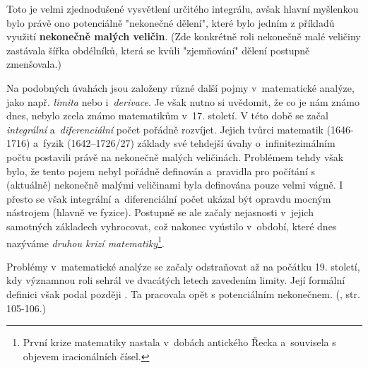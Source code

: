 Toto je velmi zjednodušené vysvětlení určitého integrálu, avšak hlavní myšlenkou bylo právě ono potenciálně "nekonečné dělení", které bylo jedním z příkladů využití \textbf{nekonečně malých veličin}. (Zde konkrétně roli nekonečně malé veličiny zastávala šířka obdélníků, která se kvůli "zjemňování" dělení postupně zmenšovala.)\par
Na podobných úvahách jsou založeny různé další pojmy v~matematické analýze, jako např. \emph{limita} nebo i~\emph{derivace}. Je však nutno si uvědomit, že co je nám známo dnes, nebylo zcela známo matematikům v~17. století. V této době se začal \emph{integrální} a~\emph{diferenciální} počet pořádně rozvíjet. Jejich tvůrci matematik  \mbox{(1646-1716)} a~fyzik  (1642--1726/27) základy své tehdejší úvahy o~infinitezimálním počtu postavili právě na nekonečně malých veličinách. Problémem tehdy však bylo, že tento pojem nebyl pořádně definován a~pravidla pro počítání s (aktuálně) nekonečně malými veličinami byla definována pouze velmi vágně. I přesto se však integrální a~diferenciální počet ukázal být opravdu mocným nástrojem (hlavně ve fyzice). Postupně se ale začaly nejasnosti v~jejich samotných základech vyhrocovat, což nakonec vyústilo v~období, které dnes nazýváme \emph{druhou krizí matematiky}\footnote{První krize matematiky nastala v~dobách antického Řecka a~souvisela s objevem iracionálních čísel.}.\par
Problémy v~matematické analýze se začaly odstraňovat až na počátku 19. století, kdy významnou roli sehrál ve dvacátých letech  zavedením limity. Její formální definici však podal později . Ta pracovala opět s potenciálním nekonečnem. (\cite{Fuchs2003}, str. 105-106.)